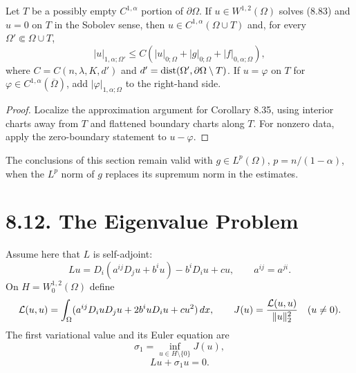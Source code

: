 \begin{corollary}
\label{gt-cor-8-36-partial-boundary-gradient-regularity}
Let $T$ be a possibly empty $C^{1,\alpha}$ portion of $\partial\Omega$. If
$u\in W^{1,2}(\Omega)$ solves (8.83) and $u=0$ on $T$ in the Sobolev sense,
then $u\in C^{1,\alpha}(\Omega\cup T)$ and, for every
$\Omega'\Subset\Omega\cup T$,
\begin{equation}
|u|_{1,\alpha;\Omega'}
\leq C(|u|_{0;\Omega}+|g|_{0;\Omega}+|f|_{0,\alpha;\Omega}),
\tag{8.91}
\end{equation}
where $C=C(n,\lambda,K,d')$ and
$d'=\operatorname{dist}(\Omega',\partial\Omega\setminus T)$. If $u=\varphi$ on $T$ for
$\varphi\in C^{1,\alpha}(\overline\Omega)$, add
$|\varphi|_{1,\alpha;\Omega}$ to the right-hand side.
\end{corollary}
\begin{proof}
\sketch Localize the approximation argument for Corollary 8.35, using interior
charts away from $T$ and flattened boundary charts along $T$. For nonzero data,
apply the zero-boundary statement to $u-\varphi$.
\end{proof}

\begin{remark}
\label{gt-rem-8-integrable-scalar-datum}
The conclusions of this section remain valid with
$g\in L^p(\Omega)$, $p=n/(1-\alpha)$, when the $L^p$ norm of $g$ replaces its
supremum norm in the estimates.
\end{remark}

\section*{8.12. The Eigenvalue Problem}

Assume here that $L$ is self-adjoint:
\[
Lu=D_i(a^{ij}D_ju+b^iu)-b^iD_iu+cu,
\qquad a^{ij}=a^{ji}.
\]
On $H=W_0^{1,2}(\Omega)$ define
\[
\mathcal{L}(u,u)=\int_\Omega(a^{ij}D_iuD_ju+2b^iuD_iu+cu^2)\,dx,
\qquad
J(u)=\frac{\mathcal{L}(u,u)}{\|u\|_2^2}\quad(u\neq0).
\]
The first variational value and its Euler equation are
\begin{equation}
\sigma_1=\inf_{u\in H\setminus\{0\}}J(u),
\tag{8.92}
\end{equation}
\begin{equation}
Lu+\sigma_1u=0.
\tag{8.93}
\end{equation}

